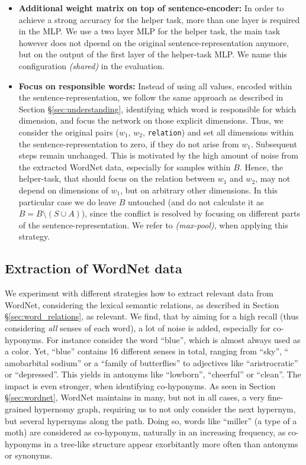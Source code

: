 \begin{itemize}
\item \textbf{Additional weight matrix on top of sentence-encoder:} In order to achieve a strong accuracy for the helper task, more than one layer is required in the \ac{MLP}. We use a two layer \ac{MLP} for the helper task, the main task however does not dpeend on the original sentence-representation anymore, but on the output of the first layer of the helper-task \ac{MLP}. We name this configuration \textit{(shared)} in the evaluation.
\item \textbf{Focus on responsible words:} Instead of using all values, encoded within the sentence-representation, we follow the same approach as described in Section §\ref{sec:understanding}, identifying which word is responsible for which dimension, and focus the network on those explicit dimensions. Thus, we consider the original pairs ($w_1$, $w_2$, \texttt{relation}) and set all dimensions within the sentence-representation to zero, if they do not arise from $w_1$. Subsequent steps remain unchanged. This is motivated by the high amount of noise from the extracted WordNet data, especially for samples within $B$. Hence, the helper-task, that should focus on the relation between $w_1$ and $w_2$, may not depend on dimensions of $w_1$, but on arbitrary other dimensions. In this particular case we do leave $B$ untouched (and do not calculate it as $B  = B \setminus (S \cup A)$), since the conflict is resolved by focusing on different parts of the sentence-representation. We refer to \textit{(max-pool)}, when applying this strategy.
\end{itemize}
\subsection{Extraction of WordNet data}
We experiment with different strategies how to extract relevant data from WordNet, considering the lexical semantic relations, as described in Section §\ref{sec:word_relations}, as relevant. We find, that by aiming for a high recall (thus considering \textit{all} senses of each word), a lot of noise is added, especially for co-hyponyms. For instance consider the word ``blue'', which is almost always used as a color. Yet, ``blue'' contains 16 different senses in total, ranging from ``sky'', `` amobarbital sodium'' or a ``family of butterflies'' to adjectives like ``aristrocratic'' or ``depressed''. This yields in antonyms like  ``lowborn'', ``cheerful'' or ``clean''. The impact is even stronger, when identifying co-hyponyms. As seen in Section §\ref{sec:wordnet}, WordNet maintains in many, but not in all cases, a very fine-grained hypernomy graph, requiring us to not only consider the next hypernym, but several hypernyms along the path. Doing so, words like ``miller'' (a type of a moth) are considered as co-hyponym, naturally in an increasing frequency, as co-hyponyms in a tree-like structure appear exorbitantly more often than antonyms or synonyms.

